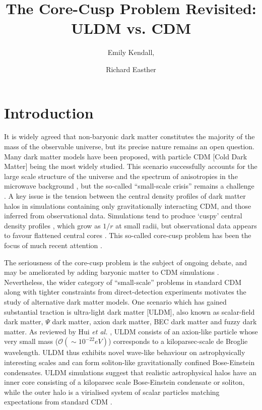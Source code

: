 \documentclass[a4paper,11pt]{article}
\title{\boldmath The Core-Cusp Problem Revisited: ULDM vs. CDM}
\author[1]{Emily Kendall,}
\author[1]{Richard Easther}
\affiliation[1]{Department of Physics, University of Auckland, Private Bag 92019, Auckland, New Zealand}
\begin{document}
\maketitle
\flushbottom


\section{Introduction}\label{sec:intro}

 
It is widely agreed that non-baryonic dark matter constitutes the majority of the mass of the observable universe, but its precise nature remains an open question. Many dark matter models have been proposed, with particle CDM [Cold Dark Matter]  being the most widely studied. This scenario successfully accounts for the large scale structure of the universe \cite{Springel:2005nw} and the spectrum of anisotropies in the microwave background \cite{deBernardis:2000sbo, Hanany:2000qf, Halverson:2001yy, Netterfield:2001yq, Lee:2001yp, Ade:2015xua,  Hu:2001bc}, but the so-called ``small-scale crisis''  remains a challenge \cite{Weinberg:2013aya}. A key issue is the tension between the  central density profiles of dark matter halos in simulations containing only gravitationally interacting CDM, and those inferred from observational data. Simulations tend to produce `cuspy' central density profiles \cite{Navarro:1995iw}, which grow as $1/r$ at small radii, but observational data appears to favour flattened central cores \cite{Moore:1994yx}. This so-called core-cusp problem has been the focus of much recent attention \cite{Dutton:2018nop, Read:2018pft, Genina:2018}. 
 
The seriousness of the core-cusp problem is the subject of ongoing debate, and may be ameliorated by adding baryonic matter to CDM simulations \cite{Benitez-Llambay:2018}. Nevertheless, the wider category of  ``small-scale'' problems in standard CDM along with tighter constraints from direct-detection experiments \cite{Schumann:2019eaa} motivates the study of alternative dark matter models. One scenario which has gained substantial traction is ultra-light dark matter [ULDM], also known as scalar-field dark matter, $\Psi$ dark matter, axion dark matter, BEC dark matter and fuzzy dark matter. As reviewed by Hui {\em et al.\/} \cite{Hui:2016ltb}, ULDM consists of an axion-like particle whose very small mass  ($\mathcal{O}(\sim 10^{-22}eV)$) corresponds to a kiloparsec-scale de Broglie wavelength. ULDM thus exhibits novel wave-like behaviour on astrophysically interesting scales and can form soliton-like gravitationally confined Bose-Einstein condensates. ULDM simulations suggest that realistic astrophysical halos have an inner core consisting of a kiloparsec scale Bose-Einstein condensate or soliton, while the outer halo is a virialised system of scalar particles matching expectations from standard CDM \cite{Schwabe:2016rze, Veltmaat:2018dfz}. 
\end{document}
